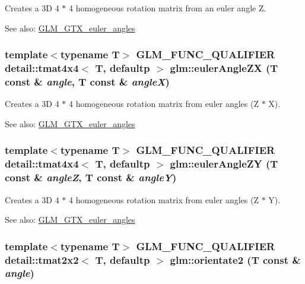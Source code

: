 Creates a 3D 4 $\ast$ 4 homogeneous rotation matrix from an euler angle Z. \begin{Desc}
\item[See also:]\hyperlink{group__gtx__euler__angles}{GLM\_\-GTX\_\-euler\_\-angles} \end{Desc}
\hypertarget{group__gtx__euler__angles_g3709f9eb45b49ecf41d42bec91c031fa}{
\subsubsection[eulerAngleZX]{\setlength{\rightskip}{0pt plus 5cm}template$<$typename T$>$ GLM\_\-FUNC\_\-QUALIFIER detail::tmat4x4$<$ T, defaultp $>$ glm::eulerAngleZX (T const \& {\em angle}, \/  T const \& {\em angleX})}}
\label{group__gtx__euler__angles_g3709f9eb45b49ecf41d42bec91c031fa}


Creates a 3D 4 $\ast$ 4 homogeneous rotation matrix from euler angles (Z $\ast$ X). \begin{Desc}
\item[See also:]\hyperlink{group__gtx__euler__angles}{GLM\_\-GTX\_\-euler\_\-angles} \end{Desc}
\hypertarget{group__gtx__euler__angles_gfcd7d34bef520fd8bee6d4d865a8162a}{
\subsubsection[eulerAngleZY]{\setlength{\rightskip}{0pt plus 5cm}template$<$typename T$>$ GLM\_\-FUNC\_\-QUALIFIER detail::tmat4x4$<$ T, defaultp $>$ glm::eulerAngleZY (T const \& {\em angleZ}, \/  T const \& {\em angleY})}}
\label{group__gtx__euler__angles_gfcd7d34bef520fd8bee6d4d865a8162a}


Creates a 3D 4 $\ast$ 4 homogeneous rotation matrix from euler angles (Z $\ast$ Y). \begin{Desc}
\item[See also:]\hyperlink{group__gtx__euler__angles}{GLM\_\-GTX\_\-euler\_\-angles} \end{Desc}
\hypertarget{group__gtx__euler__angles_g026f776506cd9c5b144c6d4b410a079b}{
\subsubsection[orientate2]{\setlength{\rightskip}{0pt plus 5cm}template$<$typename T$>$ GLM\_\-FUNC\_\-QUALIFIER detail::tmat2x2$<$ T, defaultp $>$ glm::orientate2 (T const \& {\em angle})}}
\label{group__gtx__euler__angles_g026f776506cd9c5b144c6d4b410a079b}


